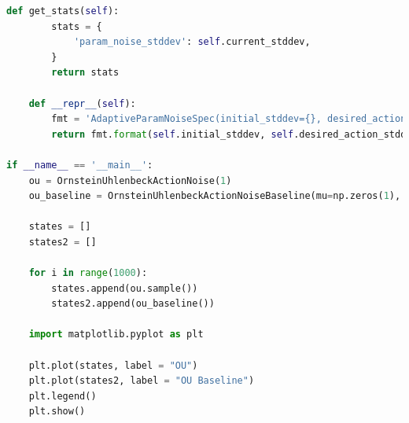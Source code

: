 \documentclass[12pt,A4]{report}
\begin{document}
\begin{lstlisting}[language=Python, caption=utilities.py, frame=single]
    def get_stats(self):
        stats = {
            'param_noise_stddev': self.current_stddev,
        }
        return stats

    def __repr__(self):
        fmt = 'AdaptiveParamNoiseSpec(initial_stddev={}, desired_action_stddev={}, adaptation_coefficient={})'
        return fmt.format(self.initial_stddev, self.desired_action_stddev, self.adaptation_coefficient)

if __name__ == '__main__':
    ou = OrnsteinUhlenbeckActionNoise(1)
    ou_baseline = OrnsteinUhlenbeckActionNoiseBaseline(mu=np.zeros(1), sigma=float(0.2) * np.ones(1))
    
    states = []
    states2 = []
    
    for i in range(1000):
        states.append(ou.sample())
        states2.append(ou_baseline())
	
    import matplotlib.pyplot as plt
    
    plt.plot(states, label = "OU")
    plt.plot(states2, label = "OU Baseline")
    plt.legend()
    plt.show()

\end{lstlisting}
\end{document}
